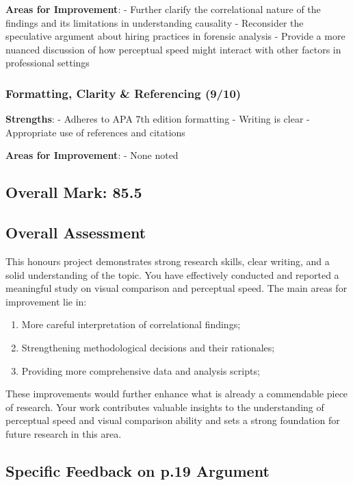 \documentclass[
  single column]{article}
\providecommand{\tightlist}{%
  \setlength{\itemsep}{0pt}\setlength{\parskip}{0pt}}\usepackage{longtable,booktabs,array}
\begin{document}
\textbf{Areas for Improvement}: - Further clarify the correlational
nature of the findings and its limitations in understanding causality -
Reconsider the speculative argument about hiring practices in forensic
analysis - Provide a more nuanced discussion of how perceptual speed
might interact with other factors in professional settings

\subsubsection{Formatting, Clarity \& Referencing
(9/10)}\label{formatting-clarity-referencing-910}

\textbf{Strengths}: - Adheres to APA 7th edition formatting - Writing is
clear - Appropriate use of references and citations

\textbf{Areas for Improvement}: - None noted

\subsection{Overall Mark: 85.5}\label{overall-mark-85.5}

\subsection{Overall Assessment}\label{overall-assessment}

This honours project demonstrates strong research skills, clear writing,
and a solid understanding of the topic. You have effectively conducted
and reported a meaningful study on visual comparison and perceptual
speed. The main areas for improvement lie in:

\begin{enumerate}
\def\labelenumi{\arabic{enumi}.}
\tightlist
\item
  More careful interpretation of correlational findings;
\item
  Strengthening methodological decisions and their rationales;
\item
  Providing more comprehensive data and analysis scripts;
\end{enumerate}

These improvements would further enhance what is already a commendable
piece of research. Your work contributes valuable insights to the
understanding of perceptual speed and visual comparison ability and sets
a strong foundation for future research in this area.

\subsection{Specific Feedback on p.19
Argument}\label{specific-feedback-on-p.19-argument}
\end{document}
